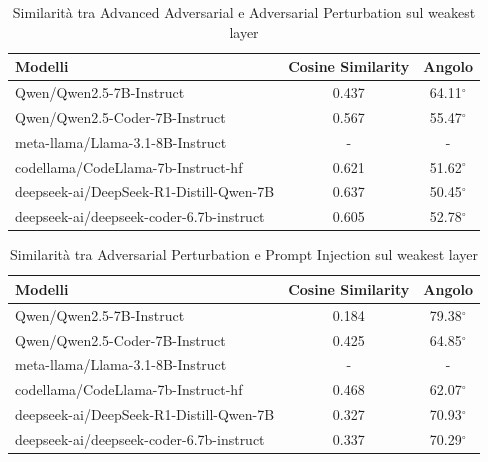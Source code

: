 \begin{table}[H]
    \centering
    \begin{tabular}{l c c }
        \toprule
        \textbf{Modelli} & \textbf{Cosine Similarity} & \textbf{Angolo} \\
        \midrule
        Qwen/Qwen2.5-7B-Instruct                 & 0.437  & 64.11$^\circ$ \\
        Qwen/Qwen2.5-Coder-7B-Instruct           & 0.567  & 55.47$^\circ$ \\
        meta-llama/Llama-3.1-8B-Instruct         & - & - \\
        codellama/CodeLlama-7b-Instruct-hf       & 0.621  & 51.62$^\circ$ \\
        deepseek-ai/DeepSeek-R1-Distill-Qwen-7B  & 0.637  & 50.45$^\circ$ \\
        deepseek-ai/deepseek-coder-6.7b-instruct & 0.605 & 52.78$^\circ$ \\
        \bottomrule
    \end{tabular}
    \vspace{0.2cm}
    \caption{Similarità tra Advanced Adversarial e Adversarial Perturbation sul weakest layer}
    \label{tab:esito_iso_AA_AP}
\end{table}

\begin{table}[H]
    \centering
    \begin{tabular}{l c c }
        \toprule
        \textbf{Modelli} & \textbf{Cosine Similarity} & \textbf{Angolo} \\
        \midrule
        Qwen/Qwen2.5-7B-Instruct                 & 0.184  & 79.38$^\circ$ \\
        Qwen/Qwen2.5-Coder-7B-Instruct           & 0.425  & 64.85$^\circ$ \\
        meta-llama/Llama-3.1-8B-Instruct         & - & - \\
        codellama/CodeLlama-7b-Instruct-hf       & 0.468  & 62.07$^\circ$ \\
        deepseek-ai/DeepSeek-R1-Distill-Qwen-7B  & 0.327  & 70.93$^\circ$ \\
        deepseek-ai/deepseek-coder-6.7b-instruct & 0.337 & 70.29$^\circ$ \\
        \bottomrule
    \end{tabular}
    \vspace{0.2cm}
    \caption{Similarità tra Adversarial Perturbation e Prompt Injection sul weakest layer}
    \label{tab:esito_iso_AP_PI}
\end{table}


